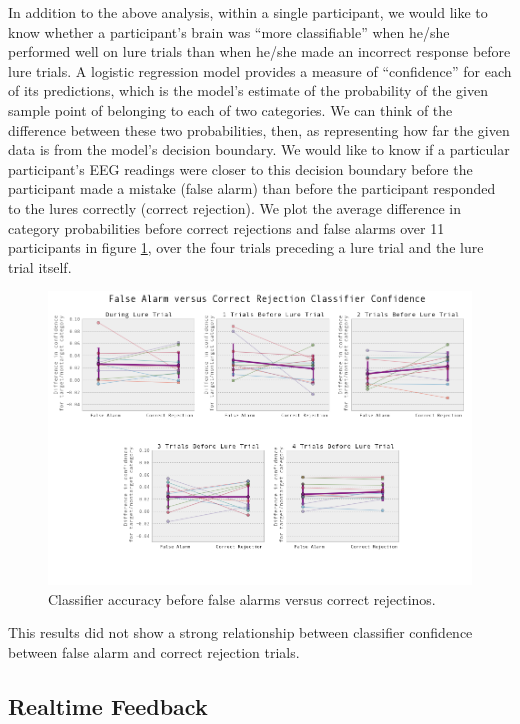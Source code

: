 \documentclass[12pt]{report}
\begin{document}
	In addition to the above analysis, within a single participant, we would like to know whether a participant's brain was ``more classifiable'' when he/she performed well on lure trials than when he/she made an incorrect response before lure trials.  A logistic regression model provides a measure of ``confidence'' for each of its predictions, which is the model's estimate of the probability of the given sample point of belonging to each of two categories.  We can think of the difference between these two probabilities, then, as representing how far the given data is from the model's decision boundary.  We would like to know if a particular participant's EEG readings were closer to this decision boundary before the participant made a mistake (false alarm) than before the participant responded to the lures correctly (correct rejection).  We plot the average difference in category probabilities before correct rejections and false alarms over 11 participants in figure \ref{falsealarmcorrectreject}, over the four trials preceding a lure trial and the lure trial itself.  

\begin{figure}[t]
\centerline{
\includegraphics[width=6in]{trialsbeforelureacc}
}
\caption{Classifier accuracy before false alarms versus correct rejectinos.\label{falsealarmcorrectreject}}
\end{figure}

	This results did not show a strong relationship between classifier confidence between false alarm and correct rejection trials.

\subsection{Realtime Feedback}
\end{document}
